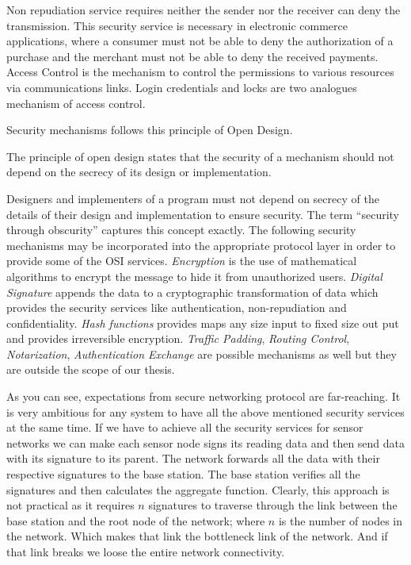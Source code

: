 	Non repudiation service requires neither the sender nor the receiver can deny the transmission.
	This security service is necessary in electronic commerce applications, where a consumer must not be able to deny the authorization of a purchase and the merchant must not be able to deny the received payments.
	Access Control is the mechanism to control the permissions to various resources via communications links.
	Login credentials and locks are two analogues mechanism of access control.

	Security mechanisms follows this principle of Open Design.
	\begin{definition}\cite{bishop2004introduction}
		The principle of open design states that the security of a mechanism should not depend on the secrecy of its design or implementation.
		\label{def:open-design}
	\end{definition}
	Designers and implementers of a program must not depend on secrecy of the details of their design and implementation to ensure security.
	The term ``security through obscurity'' captures this concept exactly.
	The following security mechanisms may be incorporated into the appropriate protocol layer in order to provide some of the OSI services.
	\textit{Encryption} is the use of mathematical algorithms to encrypt the message to hide it from unauthorized users.
	\textit{Digital Signature} appends the data to a cryptographic transformation of data which provides the security services like authentication, non-repudiation and confidentiality.
	\textit{Hash functions} provides maps any size input to fixed size out put and provides irreversible encryption.
	\textit{Traffic Padding}, \textit{Routing Control}, \textit{Notarization}, \textit{Authentication Exchange} are possible mechanisms as well but they are outside the scope of our thesis.

	As you can see, expectations from secure networking protocol are far-reaching.
	It is very ambitious for any system to have all the above mentioned security services at the same time.
	If we have to achieve all the security services for sensor networks we can make each sensor node signs its reading data and then send data with its signature to its parent.
	The network forwards all the data with their respective signatures to the base station.
	The base station verifies all the signatures and then calculates the aggregate function.
	Clearly, this approach is not practical as it requires $n$ signatures to traverse through the link between the base station and the root node of the network; where $n$ is the number of nodes in the network.
	Which makes that link the bottleneck link of the network. 
	And if that link breaks we loose the entire network connectivity.

